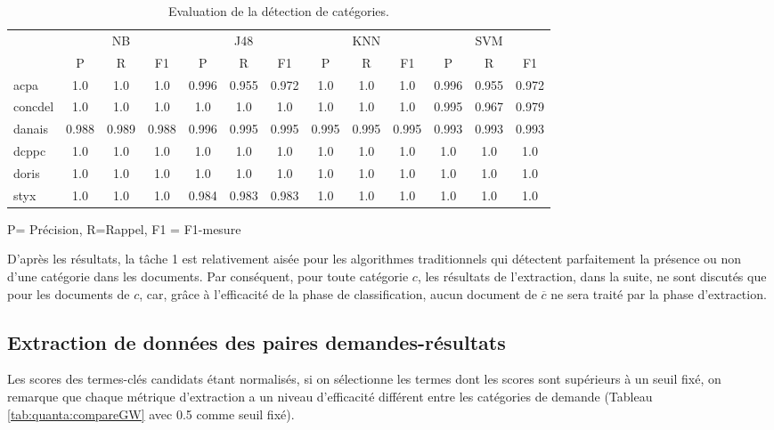 \begin{table}[!h]
	\scriptsize
	\centering
	\begin{tabular}{l|ccc|ccc|ccc|ccc}
		\hline\noalign{\smallskip}
		&   \multicolumn{3}{|c|}{NB}    &    \multicolumn{3}{|c|}{J48}   &  \multicolumn{3}{|c|}{KNN}  & \multicolumn{3}{|c}{SVM}     \\       
		\noalign{\smallskip}
		\hline
		\noalign{\smallskip}
		& P     & R     & F1    & P     & R     & F1    & P     & R     & F1    & P     & R     & F1    \\        
		\noalign{\smallskip}
		\hline
		\noalign{\smallskip}
		acpa    & 1.0 & 1.0 & 1.0 & 0.996 & 0.955 & 0.972 & 1.0 & 1.0 & 1.0 & 0.996 & 0.955 & 0.972 \\
		concdel & 1.0 & 1.0 & 1.0 & 1.0 & 1.0 & 1.0 & 1.0 & 1.0 & 1.0 & 0.995 & 0.967 & 0.979 \\
		danais  & 0.988 & 0.989 & 0.988 & 0.996 & 0.995 & 0.995 & 0.995 & 0.995 & 0.995 & 0.993 & 0.993 & 0.993 \\
		dcppc   & 1.0 & 1.0 & 1.0 & 1.0 & 1.0 & 1.0 & 1.0 & 1.0 & 1.0 & 1.0 & 1.0 & 1.0 \\
		doris   & 1.0 & 1.0 & 1.0 & 1.0 & 1.0 & 1.0 & 1.0 & 1.0 & 1.0 & 1.0 & 1.0 & 1.0 \\
		styx    & 1.0 & 1.0 & 1.0 & 0.984 & 0.983 & 0.983 & 1.0 & 1.0 & 1.0 & 1.0 & 1.0 & 1.0 \\
		\hline
	\end{tabular}

P= Précision, R=Rappel, F1 = F1-mesure
	\caption{Evaluation de la détection de catégories.}\label{tab:quanta:resultat-detect-cat}
\end{table}

D'après les résultats, la tâche 1 est relativement aisée pour les algorithmes traditionnels qui détectent parfaitement la présence ou non d'une catégorie dans les documents. Par conséquent, pour toute catégorie $c$, les résultats de l'extraction, dans la suite, ne sont discutés que pour les documents de $c$, car, grâce à l'efficacité de la phase de classification, aucun document de $\overline{c}$ ne sera traité par la phase d'extraction.

\subsection{Extraction de données des paires demandes-résultats}
Les scores des termes-clés candidats étant normalisés, si on sélectionne les termes dont les scores sont supérieurs à un seuil fixé, on remarque que chaque métrique d'extraction a un niveau d'efficacité différent entre les catégories de demande (Tableau \ref{tab:quanta:compareGW} avec 0.5 comme  seuil fixé). 

